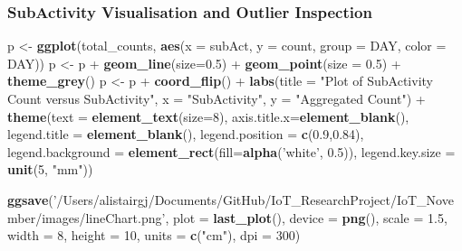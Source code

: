 \documentclass[11pt,]{article}
\newenvironment{Shaded}{\begin{snugshade}}{\end{snugshade}}
\newcommand{\DataTypeTok}[1]{\textcolor[rgb]{0.00,0.34,0.68}{#1}}
\newcommand{\DecValTok}[1]{\textcolor[rgb]{0.69,0.50,0.00}{#1}}
\newcommand{\FloatTok}[1]{\textcolor[rgb]{0.69,0.50,0.00}{#1}}
\newcommand{\KeywordTok}[1]{\textcolor[rgb]{0.12,0.11,0.11}{\textbf{#1}}}
\newcommand{\NormalTok}[1]{\textcolor[rgb]{0.12,0.11,0.11}{#1}}
\newcommand{\OperatorTok}[1]{\textcolor[rgb]{0.12,0.11,0.11}{#1}}
\newcommand{\StringTok}[1]{\textcolor[rgb]{0.75,0.01,0.01}{#1}}
\begin{document}
\hypertarget{subactivity-visualisation-and-outlier-inspection}{%
\subsubsection{SubActivity Visualisation and Outlier
Inspection}\label{subactivity-visualisation-and-outlier-inspection}}

\begin{Shaded}
\begin{Highlighting}[]
\NormalTok{p <-}\StringTok{ }\KeywordTok{ggplot}\NormalTok{(total_counts, }\KeywordTok{aes}\NormalTok{(}\DataTypeTok{x =}\NormalTok{ subAct, }\DataTypeTok{y =}\NormalTok{ count, }\DataTypeTok{group =}\NormalTok{ DAY, }\DataTypeTok{color =}\NormalTok{ DAY))}
\NormalTok{p <-}\StringTok{ }\NormalTok{p }\OperatorTok{+}\StringTok{ }\KeywordTok{geom_line}\NormalTok{(}\DataTypeTok{size=}\FloatTok{0.5}\NormalTok{) }\OperatorTok{+}\StringTok{ }\KeywordTok{geom_point}\NormalTok{(}\DataTypeTok{size =} \FloatTok{0.5}\NormalTok{) }\OperatorTok{+}\StringTok{ }\KeywordTok{theme_grey}\NormalTok{()}
\NormalTok{p <-}\StringTok{ }\NormalTok{p }\OperatorTok{+}\StringTok{ }\KeywordTok{coord_flip}\NormalTok{() }\OperatorTok{+}\StringTok{ }\KeywordTok{labs}\NormalTok{(}\DataTypeTok{title =} \StringTok{"Plot of SubActivity Count versus SubActivity"}\NormalTok{,}
                             \DataTypeTok{x =} \StringTok{"SubActivity"}\NormalTok{,}
                             \DataTypeTok{y =} \StringTok{"Aggregated Count"}\NormalTok{) }\OperatorTok{+}
\StringTok{  }\KeywordTok{theme}\NormalTok{(}\DataTypeTok{text =} \KeywordTok{element_text}\NormalTok{(}\DataTypeTok{size=}\DecValTok{8}\NormalTok{), }
      \DataTypeTok{axis.title.x=}\KeywordTok{element_blank}\NormalTok{(),}
      \DataTypeTok{legend.title =} \KeywordTok{element_blank}\NormalTok{(),}
      \DataTypeTok{legend.position =} \KeywordTok{c}\NormalTok{(}\FloatTok{0.9}\NormalTok{,}\FloatTok{0.84}\NormalTok{),}
      \DataTypeTok{legend.background =} \KeywordTok{element_rect}\NormalTok{(}\DataTypeTok{fill=}\KeywordTok{alpha}\NormalTok{(}\StringTok{'white'}\NormalTok{, }\FloatTok{0.5}\NormalTok{)),}
      \DataTypeTok{legend.key.size =} \KeywordTok{unit}\NormalTok{(}\DecValTok{5}\NormalTok{, }\StringTok{"mm"}\NormalTok{))}

\KeywordTok{ggsave}\NormalTok{(}\StringTok{'/Users/alistairgj/Documents/GitHub/IoT_ResearchProject/IoT_November/images/lineChart.png'}\NormalTok{, }
       \DataTypeTok{plot =} \KeywordTok{last_plot}\NormalTok{(), }\DataTypeTok{device =} \KeywordTok{png}\NormalTok{(), }
       \DataTypeTok{scale =} \FloatTok{1.5}\NormalTok{, }\DataTypeTok{width =} \DecValTok{8}\NormalTok{, }\DataTypeTok{height =} \DecValTok{10}\NormalTok{, }\DataTypeTok{units =} \KeywordTok{c}\NormalTok{(}\StringTok{"cm"}\NormalTok{), }\DataTypeTok{dpi =} \DecValTok{300}\NormalTok{)}
\end{Highlighting}
\end{Shaded}
\end{document}
